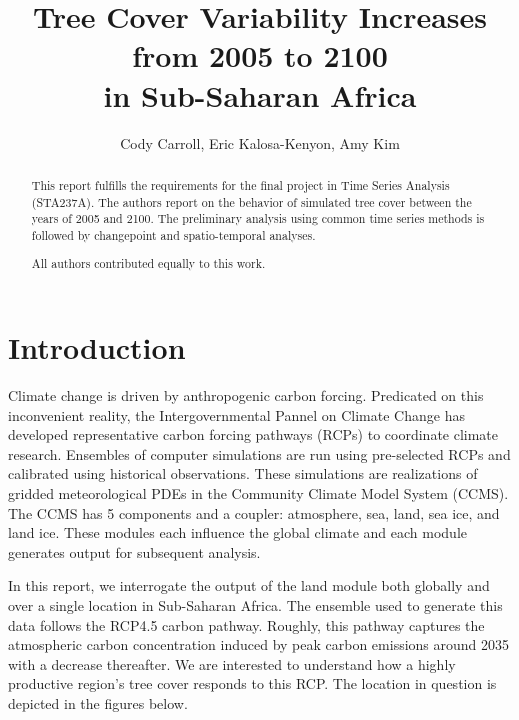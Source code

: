 \documentclass[11pt]{article}
\title{Tree Cover Variability Increases from 2005 to 2100\\ in Sub-Saharan Africa}
\author{Cody Carroll, Eric Kalosa-Kenyon, Amy Kim}
\begin{document}
\maketitle

\begin{abstract}
This report fulfills the requirements for the final project in Time Series
    Analysis (STA237A). The authors report on the behavior of simulated tree
    cover between the years of 2005 and 2100. The preliminary analysis using
    common time series methods is followed by changepoint and spatio-temporal
    analyses.

    All authors contributed equally to this work.
\end{abstract}

\section{Introduction}
Climate change is driven by anthropogenic carbon forcing. Predicated on this
inconvenient reality, the Intergovernmental Pannel on Climate Change has
developed representative carbon forcing pathways (RCPs) to coordinate
climate research. Ensembles of computer simulations are run using pre-selected
RCPs and calibrated using historical observations. These simulations are
realizations of gridded meteorological PDEs in the Community Climate Model
System (CCMS). The CCMS has 5 components and a coupler: atmosphere, sea, land,
sea ice, and land ice. These modules each influence the global climate and each
module generates output for subsequent analysis.

In this report, we interrogate the output of the land module both globally and
over a single location in Sub-Saharan Africa. The ensemble used to generate this
data follows the RCP4.5 carbon pathway. Roughly, this pathway captures the
atmospheric carbon concentration induced by peak carbon emissions around 2035
with a decrease thereafter. We are interested to understand how a highly
productive region's tree cover responds to this RCP. The location in question is
depicted in the figures below.
\end{document}

